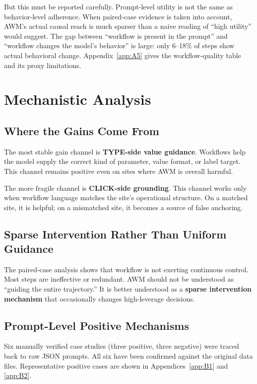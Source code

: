 \documentclass{article}
\begin{document}
But this must be reported carefully. Prompt-level utility is not the
same as behavior-level adherence. When paired-case evidence is taken
into account, AWM's actual causal reach is much sparser than a naive
reading of ``high utility'' would suggest. The gap between ``workflow is
present in the prompt'' and ``workflow changes the model's behavior'' is
large: only 6--18\% of steps show actual behavioral change.
Appendix~\ref{app:A5} gives the workflow-quality table and its proxy
limitations.

\section{Mechanistic Analysis}\label{mechanism-audit}

\subsection{Where the Gains Come
From}\label{where-the-gains-come-from}

The most stable gain channel is \textbf{TYPE-side value guidance}.
Workflows help the model supply the correct kind of parameter, value
format, or label target. This channel remains positive even on sites
where AWM is overall harmful.

The more fragile channel is \textbf{CLICK-side grounding}. This channel
works only when workflow language matches the site's operational
structure. On a matched site, it is helpful; on a mismatched site, it
becomes a source of false anchoring.

\subsection{Sparse Intervention Rather Than Uniform
Guidance}\label{sparse-intervention-rather-than-uniform-guidance}

The paired-case analysis shows that workflow is not exerting continuous
control. Most steps are ineffective or redundant. AWM should not be
understood as ``guiding the entire trajectory.'' It is better understood
as a \textbf{sparse intervention mechanism} that occasionally changes
high-leverage decisions.

\subsection{Prompt-Level Positive
Mechanisms}\label{prompt-level-positive-mechanisms}

Six manually verified case studies (three positive, three negative) were
traced back to raw JSON prompts. All six have been confirmed against the
original data files. Representative positive cases are shown in
Appendices~\ref{app:B1} and \ref{app:B2}.
\end{document}
